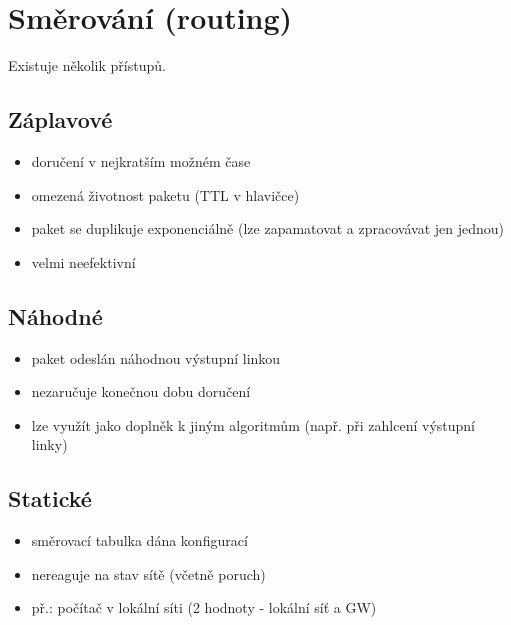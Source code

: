 \documentclass{szzclass}
\providecommand{\tightlist}{%
  \setlength{\itemsep}{0pt}\setlength{\parskip}{0pt}}
\begin{document}
\hypertarget{smux11brovuxe1nuxed-routing}{%
\section{Směrování (routing)}\label{smux11brovuxe1nuxed-routing}}

Existuje několik přístupů.

\hypertarget{zuxe1plavovuxe9}{%
\subsection{Záplavové}\label{zuxe1plavovuxe9}}

\begin{itemize}
\tightlist
\item
  doručení v nejkratším možném čase
\item
  omezená životnost paketu (TTL v hlavičce)
\item
  paket se duplikuje exponenciálně (lze zapamatovat a zpracovávat jen
  jednou)
\item
  velmi neefektivní
\end{itemize}

\hypertarget{nuxe1hodnuxe9}{%
\subsection{Náhodné}\label{nuxe1hodnuxe9}}

\begin{itemize}
\tightlist
\item
  paket odeslán náhodnou výstupní linkou
\item
  nezaručuje konečnou dobu doručení
\item
  lze využít jako doplněk k jiným algoritmům (např. při zahlcení
  výstupní linky)
\end{itemize}

\hypertarget{statickuxe9}{%
\subsection{Statické}\label{statickuxe9}}

\begin{itemize}
\tightlist
\item
  směrovací tabulka dána konfigurací
\item
  nereaguje na stav sítě (včetně poruch)
\item
  př.: počítač v lokální síti (2 hodnoty - lokální síť a GW)
\end{itemize}
\end{document}
